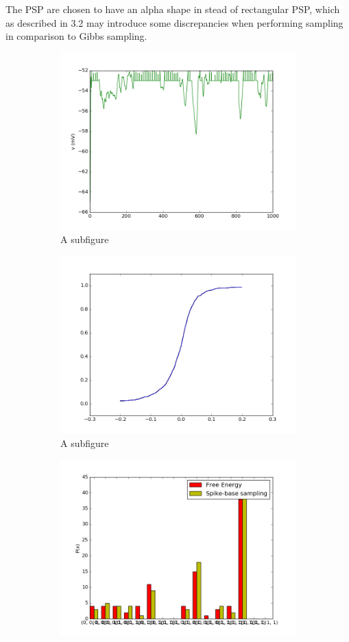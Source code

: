 The PSP are chosen to have an alpha shape in stead of rectangular PSP, which as described in 3.2 may introduce some discrepancies when performing sampling in comparison to Gibbs sampling.

\begin{figure}
	\centering
	\begin{subfigure}[t]{.5\textwidth}
  		\centering
  		\includegraphics[width=.8\linewidth]{imgs/coba_lif_act.png}
  		\caption{A subfigure}
  		\label{fig:sub1}
	\end{subfigure}%
	\begin{subfigure}[t]{.5\textwidth}
  		\centering
  		\includegraphics[width=.8\linewidth]{imgs/coba_lif_sigmoid.png}
  		\caption{A subfigure}
  		\label{fig:sub2}
	\end{subfigure}
	\begin{subfigure}[t]{.5\textwidth}
  		\centering
  		\includegraphics[width=.8\linewidth]{imgs/coba_lif_bm2.png}

\end{subfigure}
\end{figure}
